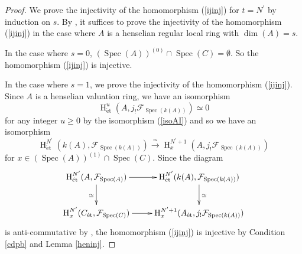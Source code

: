 \documentclass{article}
\newcommand{\spec}{\operatorname{Spec}}
\newcommand{\et}{\mathrm{\acute{e}t}}
\newcommand{\HO}{\operatorname{H}}
\begin{document}
\begin{proof}
We prove the injectivity of the homomorphism (\ref{ijinj}) for $t=N^{\prime}$ by induction on $s$.
By \cite[p.93, III, Corollary 1.28]{M}, it suffices to prove the injectivity of
the homomorphism (\ref{ijinj}) in the case where $A$ is a henselian regular local ring 
with $\operatorname{dim}(A)=s$.

In the case where $s=0$, $(\spec(A))^{(0)}\cap \spec(C)=\emptyset$.
So the homomorphism (\ref{ijinj}) is injective.

In the case where $s=1$, we prove the injectivity of the homomorphism (\ref{ijinj}).
Since $A$ is a henselian valuation ring, 
we have an isomorphism
%
\begin{equation*}
\HO^{u}_{\et}\left(
A,
j_{!}\mathcal{F}_{\spec(k(A))}
\right)
\simeq 0
\end{equation*}
%
for any integer $u\geq 0$ by the isomorphism (\ref{isoAI})
and so we have an isomorphism
%
\begin{equation*}
\HO^{N^{\prime}}_{\et}(
k(A),
\mathcal{F}_{\spec(k(A))}
)    
\xrightarrow{\simeq}
\HO^{N^{\prime}+1}_{x}(
A, 
j_{!}\mathcal{F}_{\spec(k(A))}
)
\end{equation*}
%
for $x\in (\spec(A))^{(1)}\cap \spec(C)$.
Since the diagram
%
\begin{equation}\label{AntAC}
\xymatrix{
\HO^{N^{\prime}}_{\et}(
A,
\mathcal{F}_{\spec(A)}
)
\ar[r]\ar[d]_{\simeq}
&
\HO^{N^{\prime}}_{\et}(
k(A),
\mathcal{F}_{\spec(k(A))}
)
\ar[d]^{\simeq}
\\
\HO^{N^{\prime}}_{x}(
C_{\et},
\mathcal{F}_{\spec(C)}
)
\ar[r]
&
\HO^{N^{\prime}+1}_{x}(
A_{\et},
j_{!}
\mathcal{F}_{\spec(k(A))}
)
}    
\end{equation}
%
is anti-commutative by \cite[Lemma 3.11]{Sak5}, the homomorphism (\ref{ijinj}) is injective by
Condition \ref{cdpb} and Lemma \ref{heninj}.


\end{proof}
\end{document}
